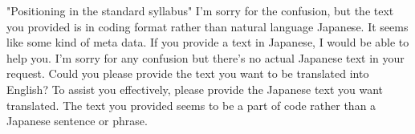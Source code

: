 "Positioning in the standard syllabus"
I'm sorry for the confusion, but the text you provided is in coding format rather than natural language Japanese. It seems like some kind of meta data. If you provide a text in Japanese, I would be able to help you.
I'm sorry for any confusion but there's no actual Japanese text in your request. Could you please provide the text you want to be translated into English?
To assist you effectively, please provide the Japanese text you want translated. The text you provided seems to be a part of code rather than a Japanese sentence or phrase.

